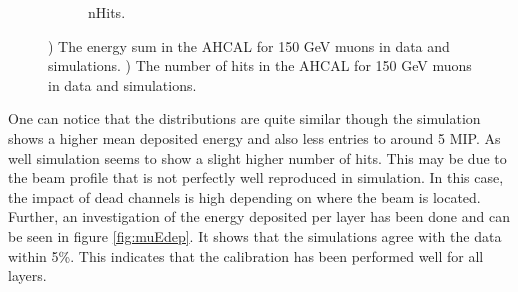 \begin{figure}[htbp!]
\begin{subfigure}[t]{0.49\textwidth}
    \caption{nHits.} \label{fig:munHits}
  \end{subfigure}
  \caption{) The energy sum in the AHCAL for 150 GeV muons in data and simulations. ) The number of hits in the AHCAL for 150 GeV muons in data and simulations.}
  \label{fig:muVal}
\end{figure}

One can notice that the distributions are quite similar though the simulation shows a higher mean deposited energy and also less entries to around 5 MIP. As well simulation seems to show a slight higher number of hits. This may be due to the beam profile that is not perfectly well reproduced in simulation. In this case, the impact of dead channels is high depending on where the beam is located. Further, an investigation of the energy deposited per layer has been done and can be seen in figure \ref{fig:muEdep}. It shows that the simulations agree with the data within 5\%. This indicates that the calibration has been performed well for all layers.

